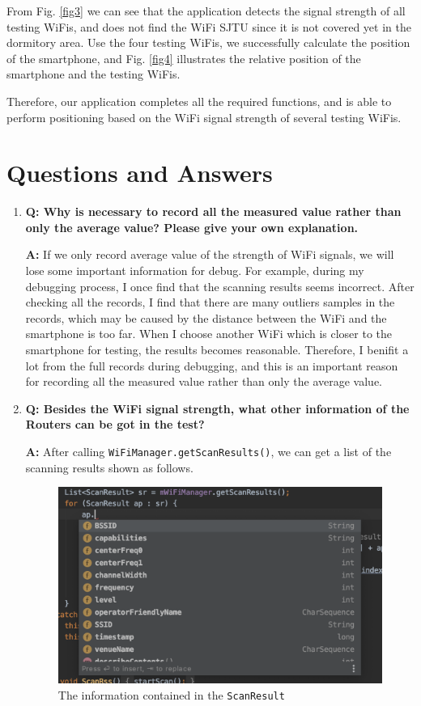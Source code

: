 \documentclass[12pt, a4paper]{article}
\theoremstyle{definition}
\begin{document}
From Fig. \ref{fig3} we can see that the application detects the signal strength of all testing WiFis, and does not find the WiFi SJTU since it is not covered yet in the dormitory area. Use the four testing WiFis, we successfully calculate the position of the smartphone, and Fig. \ref{fig4} illustrates the relative position of the smartphone and the testing WiFis.

Therefore, our application completes all the required functions, and is able to perform positioning based on the WiFi signal strength of several testing WiFis.

\section{Questions and Answers}
\begin{enumerate}
\item \textbf{Q: Why is necessary to record all the measured value rather than only the average value? Please give your own explanation.}

\textbf{A: } If we only record average value of the strength of WiFi signals, we will lose some important information for debug. For example, during my debugging process, I once find that the scanning results seems incorrect. After checking all the records, I find that there are many outliers samples in the records, which may be caused by the distance between the WiFi and the smartphone is too far. When I choose another WiFi which is closer to the smartphone for testing, the results becomes reasonable. Therefore, I benifit a lot from the full records during debugging, and this is an important reason for recording all the measured value rather than only the average value.

\item \textbf{Q: Besides the WiFi signal strength, what other information of the Routers can be got in the test?}

\textbf{A: } After calling \texttt{WiFiManager.getScanResults()}, we can get a list of the scanning results shown as follows.

\begin{figure}[htbp]
	\centering
	\includegraphics[width=4.2in]{5.png}
	\caption{The information contained in the \texttt{ScanResult}}
	\label{fig5}
\end{figure}


\end{enumerate}
\end{document}
